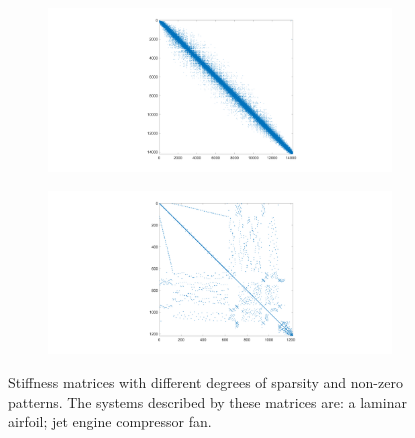 \documentclass[twoside]{article}
\begin{document}
		\begin{figure}[h!]
			\centering
			\begin{subfigure}{0.3\textwidth}
				\includegraphics[width=\textwidth,trim={410 40 400 40},clip]{2d_airfoil}
				\caption{}
				\label{fig:mat_foil}
			\end{subfigure}
			\enskip
			\begin{subfigure}{0.3\textwidth}
				\includegraphics[width=\textwidth,trim={410 40 400 40},clip]{2d_fan}
				\caption{}
				\label{fig:mat_fan}
			\end{subfigure}
			\caption{Stiffness matrices with different degrees of sparsity and non-zero patterns. The systems described by these matrices are: 
			 a laminar airfoil;  jet engine compressor fan.}
			\label{fig:matrices}
		\end{figure}

\end{document}

